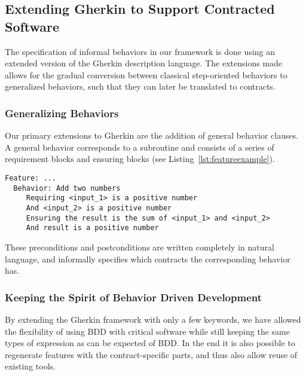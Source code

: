 \subsection{Extending Gherkin to Support Contracted Software}
\label{sub:Extending Gherkin to Support Contracted Software}

The specification of informal behaviors in our framework is done using an
extended version of the Gherkin description language.
The extensions made allows for the gradual conversion between classical step-oriented behaviors to generalized behaviors, such that they can later be translated to contracts.


\subsubsection{Generalizing Behaviors}
\label{sub:Generalizing Behaviors}

Our primary extensions to Gherkin are the addition of general
behavior clauses. A general behavior corresponds to a subroutine
and consists of a series of requirement blocks and ensuring blocks
(see Listing~\ref{lst:featureexample}).

\begin{lstlisting}[caption={General Behavior Description of Adding Natural Numbers},label={lst:featureexample}]
  Feature: ...
  Behavior: Add two numbers
     Requiring <input_1> is a positive number
     And <input_2> is a positive number
     Ensuring the result is the sum of <input_1> and <input_2>
     And result is a positive number
\end{lstlisting}


These preconditions and postconditions are written completely in
natural language, and informally specifies which contracts the corresponding
behavior has.

\subsubsection{Keeping the Spirit of Behavior Driven Development}
\label{ssub:Keeping the Spirit of Behavior Driven Development}
By extending the Gherkin framework with only a few keywords, we have allowed the flexibility of using BDD with critical software
while still keeping the same types of expression as can be expected of BDD. In the end it is also possible to regenerate features with
the contract-specific parts, and thus also allow reuse of existing tools.


